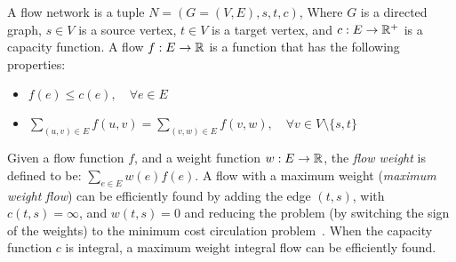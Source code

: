 A flow network is a tuple $N = (G = (V, E), s, t, c)$, 
Where $G$ is a directed graph, 
$s \in V$ is a source vertex, 
$t \in V$ is a target vertex, 
and $c : E \rightarrow \mathbb{R}^+$ is a capacity function. 
A flow $f : E \rightarrow \mathbb{R}$ is a function that has the following properties:
\begin{itemize}
\item
$f(e) \leq c(e), \quad \forall e \in E$

\item
$\sum_{(u, v) \in E} f(u, v) = \sum_{(v, w) \in E} f(v, w), \quad \forall v \in V \setminus \{s, t\}$
\end{itemize}

Given a flow function $f$, 
and a weight function $w: E \rightarrow \mathbb{R}$, 
the \emph{flow weight} is defined to be:
$\sum_{e \in E}{w(e)f(e)}$.
A flow with a maximum weight (\emph{maximum weight flow}) can be efficiently found by adding 
the edge $(t, s)$, with $c(t,s) = \infty$, and $w(t,s) = 0$ and reducing the problem
(by switching the sign of the weights) 
to the minimum cost circulation problem~\cite{tardos1985strongly}.
When the capacity function $c$ is integral, 
a maximum weight integral flow can be efficiently found.  
